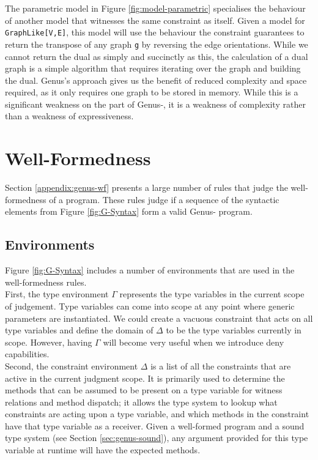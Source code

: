 The parametric model in Figure \ref{fig:model-parametric} specialises the behaviour of another model that witnesses the same constraint as itself. Given a model for \texttt{GraphLike[V,E]}, this model will use the behaviour the constraint guarantees to return the transpose of any graph \texttt{g} by reversing the edge orientations. While we cannot return the dual as simply and succinctly as this, the calculation of a dual graph is a simple algorithm that requires iterating over the graph and building the dual. Genus's approach gives us the benefit of reduced complexity and space required, as it only requires one graph to be stored in memory. While this is a significant weakness on the part of Genus-, it is a weakness of complexity rather than a weakness of expressiveness.

\newpage 

\section{Well-Formedness}

Section \ref{appendix:genus-wf} presents a large number of rules that judge the well-formedness of a program. These rules judge if a sequence of the syntactic elements from Figure \ref{fig:G-Syntax} form a valid Genus- program.

\subsection{Environments} \label{sec:genus-env}

Figure \ref{fig:G-Syntax} includes a number of environments that are used in the well-formedness rules.  \\

First, the type environment $\Gamma$ represents the type variables in the current scope of judgement. Type variables can come into scope at any point where generic parameters are instantiated. We could create a vacuous constraint that acts on all type variables and define the domain of $\Delta$ to be the type variables currently in scope. However, having $\Gamma$ will become very useful when we introduce deny capabilities. \\

Second, the constraint environment $\Delta$ is a list of all the constraints that are active in the current judgment scope. It is primarily used to determine the methods that can be assumed to be present on a type variable for witness relations and method dispatch; it allows the type system to lookup what constraints are acting upon a type variable, and which methods in the constraint have that type variable as a receiver. Given a well-formed program and a sound type system (see Section \ref{sec:genus-sound}), any argument provided for this type variable at runtime will have the expected methods.\\

